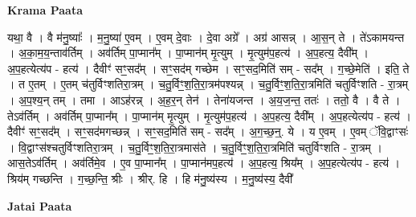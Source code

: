 \documentclass[17pt]{extarticle}
\begin{document}
\textbf{Krama Paata} \newline

यथा॒ वै । वै म॑नु॒ष्याः᳚ । म॒नु॒ष्या॑ ए॒वम् । ए॒वम् दे॒वाः । दे॒वा अग्रे᳚ । अग्र॑ आसन्न् । आ॒स॒न् ते । ते॑ऽकामयन्त । अ॒का॒म॒य॒न्ताव॑र्तिम् । अव॑र्तिम् पा॒प्मान᳚म् । पा॒प्मान॑म् मृ॒त्युम् । मृ॒त्युम॑प॒हत्य॑ । अ॒प॒हत्य॒ दैवी᳚म् । अ॒प॒हत्येत्य॑प - हत्य॑ । दैवीꣳ॑ सꣳ॒॒सद᳚म् । सꣳ॒॒सद॑म् गच्छेम । सꣳ॒॒सद॒मिति॑ सम् - सद᳚म् । ग॒च्छे॒मेति॑ । इति॒ ते । त ए॒तम् । ए॒तम् च॑तुर्विꣳशतिरा॒त्रम् । च॒तु॒र्विꣳ॒॒श॒ति॒रा॒त्रम॑पश्यन्न् । च॒तु॒र्विꣳ॒॒श॒ति॒रा॒त्रमिति॑ चतुर्विꣳशति - रा॒त्रम् । अ॒प॒श्य॒न् तम् । तमा । आऽह॑रन्न् । अ॒ह॒र॒न् तेन॑ । तेना॑यजन्त । अ॒य॒ज॒न्त॒ ततः॑ । ततो॒ वै । वै ते । तेऽव॑र्तिम् । अव॑र्तिम् पा॒प्मान᳚म् । पा॒प्मान॑म् मृ॒त्युम् । मृ॒त्युम॑प॒हत्य॑ । अ॒प॒हत्य॒ दैवी᳚म् । अ॒प॒हत्येत्य॑प - हत्य॑ । दैवीꣳ॑ सꣳ॒॒सद᳚म् । सꣳ॒॒सद॑मगच्छन्न् । सꣳ॒॒सद॒मिति॑ सम् - सद᳚म् । अ॒ग॒च्छ॒न्॒. ये । य ए॒वम् । ए॒वम् ॅवि॒द्वाꣳसः॑ । वि॒द्वाꣳस॑श्चतुर्विꣳशतिरा॒त्रम् । च॒तु॒र्विꣳ॒॒श॒ति॒रा॒त्रमास॑ते । च॒तु॒र्विꣳ॒॒श॒ति॒रा॒त्रमिति॑ चतुर्विꣳशति - रा॒त्रम् । आस॒तेऽव॑र्तिम् । अव॑र्तिमे॒व । ए॒व पा॒प्मान᳚म् । पा॒प्मान॑मप॒हत्य॑ । अ॒प॒हत्य॒ श्रिय᳚म् । अ॒प॒हत्येत्य॑प - हत्य॑ । श्रिय॑म् गच्छन्ति । ग॒च्छ॒न्ति॒ श्रीः । श्रीर्. हि । हि म॑नु॒ष्य॑स्य । म॒नु॒ष्य॑स्य॒ दैवी᳚ \newline

\textbf{Jatai Paata} \newline
\end{document}
